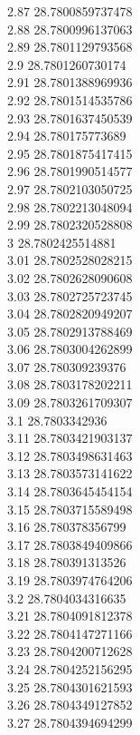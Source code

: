 {2.87	28.7800859737478\\
2.88	28.7800996137063\\
2.89	28.7801129793568\\
2.9	28.7801260730174\\
2.91	28.7801388969936\\
2.92	28.7801514535786\\
2.93	28.7801637450539\\
2.94	28.780175773689\\
2.95	28.7801875417415\\
2.96	28.7801990514577\\
2.97	28.7802103050725\\
2.98	28.7802213048094\\
2.99	28.7802320528808\\
3	28.7802425514881\\
3.01	28.7802528028215\\
3.02	28.7802628090608\\
3.03	28.7802725723745\\
3.04	28.7802820949207\\
3.05	28.7802913788469\\
3.06	28.7803004262899\\
3.07	28.780309239376\\
3.08	28.7803178202211\\
3.09	28.7803261709307\\
3.1	28.7803342936\\
3.11	28.7803421903137\\
3.12	28.7803498631463\\
3.13	28.7803573141622\\
3.14	28.7803645454154\\
3.15	28.7803715589498\\
3.16	28.780378356799\\
3.17	28.7803849409866\\
3.18	28.780391313526\\
3.19	28.7803974764206\\
3.2	28.7804034316635\\
3.21	28.7804091812378\\
3.22	28.7804147271166\\
3.23	28.7804200712628\\
3.24	28.7804252156295\\
3.25	28.7804301621593\\
3.26	28.7804349127852\\
3.27	28.7804394694299\\
}
